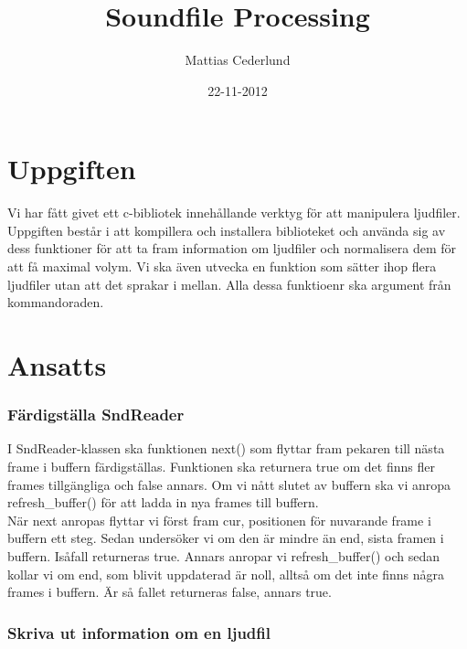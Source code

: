 \documentclass[a4paper, 11pt]{article}
\title{Soundfile Processing}
\author{Mattias Cederlund}
\date{22-11-2012}
\begin{document}
\maketitle 

\section{Uppgiften}

Vi har fått givet ett c-bibliotek innehållande verktyg för att manipulera ljudfiler. Uppgiften består i att kompillera och installera biblioteket och använda sig av dess funktioner för att ta fram information om ljudfiler och normalisera dem för att få maximal volym. Vi ska även utvecka en funktion som sätter ihop flera ljudfiler utan att det sprakar i mellan. Alla dessa funktioenr ska argument från kommandoraden.

\section{Ansatts}

\subsubsection{Färdigställa SndReader}

I SndReader-klassen ska funktionen next() som flyttar fram pekaren till nästa frame i buffern färdigställas. Funktionen ska returnera true om det finns fler frames tillgängliga och false annars. Om vi nått slutet av buffern ska vi anropa refresh\_buffer() för att ladda in nya frames till buffern.
\\[\baselineskip]
När next anropas flyttar vi först fram cur, positionen för nuvarande frame i buffern ett steg. Sedan undersöker vi om den är mindre än end, sista framen i buffern. Isåfall returneras true. Annars anropar vi refresh\_buffer() och sedan kollar vi om end, som blivit uppdaterad är noll, alltså om det inte finns några frames i buffern. Är så fallet returneras false, annars true.

\subsubsection{Skriva ut information om en ljudfil}
\end{document}
